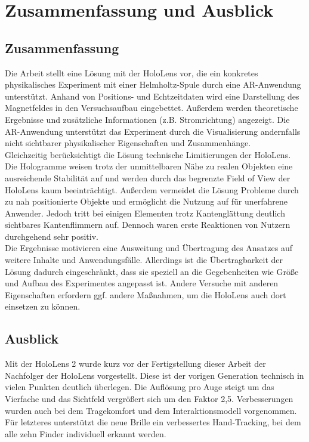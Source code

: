 \section{Zusammenfassung und Ausblick}
\label{sec-7}

\subsection{Zusammenfassung}
Die Arbeit stellt eine Lösung mit der HoloLens vor, die ein konkretes physikalisches Experiment mit einer Helmholtz-Spule durch eine AR-Anwendung unterstützt. Anhand von Positions- und Echtzeitdaten wird eine Darstellung des Magnetfeldes in den Versuchsaufbau eingebettet. Außerdem werden theoretische Ergebnisse und zusätzliche Informationen (z.B. Stromrichtung) angezeigt. Die AR-Anwendung unterstützt das Experiment durch die Visualisierung andernfalls nicht sichtbarer physikalischer Eigenschaften und Zusammenhänge.\\
\noindent\hspace*{5mm}
Gleichzeitig berücksichtigt die Lösung technische Limitierungen der HoloLens. Die Hologramme weisen trotz der unmittelbaren Nähe zu realen Objekten eine ausreichende Stabilität auf und werden durch das begrenzte Field of View der HoloLens kaum beeinträchtigt. Außerdem vermeidet die Lösung Probleme durch zu nah positionierte Objekte und ermöglicht die Nutzung auf für unerfahrene Anwender. Jedoch tritt bei einigen Elementen trotz Kantenglättung deutlich sichtbares Kantenflimmern auf. Dennoch waren erste Reaktionen von Nutzern durchgehend sehr positiv.\\
\noindent\hspace*{5mm}
Die Ergebnisse motivieren eine Ausweitung und Übertragung des Ansatzes auf weitere Inhalte und Anwendungsfälle. Allerdings ist die Übertragbarkeit der Lösung dadurch eingeschränkt, dass sie speziell an die Gegebenheiten wie Größe und Aufbau des Experimentes angepasst ist. Andere Versuche mit anderen Eigenschaften erfordern ggf. andere Maßnahmen, um die HoloLens auch dort einsetzen zu können.

\subsection{Ausblick}
Mit der HoloLens 2 wurde kurz vor der Fertigstellung dieser Arbeit der Nachfolger der HoloLens vorgestellt. Diese ist der vorigen Generation technisch in vielen Punkten deutlich überlegen. Die Auflösung pro Auge steigt um das Vierfache und das Sichtfeld vergrößert sich um den Faktor 2,5. Verbesserungen wurden auch bei dem Tragekomfort und dem Interaktionsmodell vorgenommen. Für letzteres unterstützt die neue Brille ein verbessertes Hand-Tracking, bei dem alle zehn Finder individuell erkannt werden.\\

